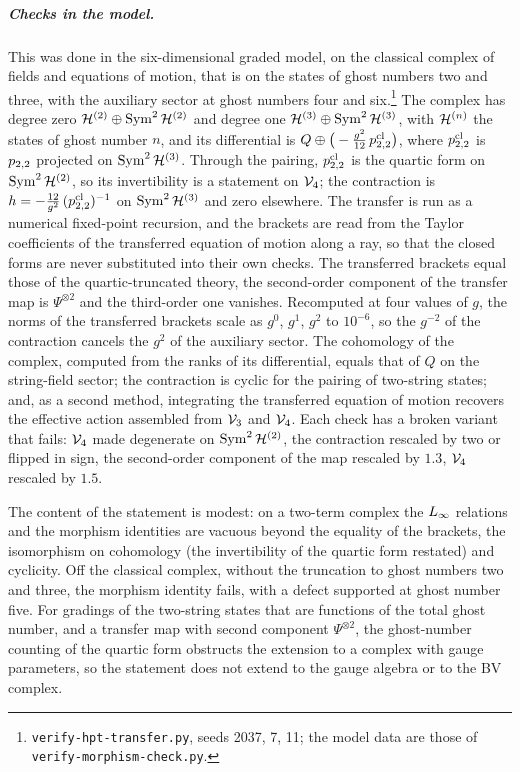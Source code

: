 \subparagraph{Checks in the model.}
This was done in the six-dimensional graded model, on the classical complex of fields and equations of motion, that is on the states of ghost numbers two and three, with the auxiliary sector at ghost numbers four and six.\footnote{\texttt{verify-hpt-transfer.py}, seeds 2037, 7, 11; the model data are those of \texttt{verify-morphism-check.py}.}
The complex has degree zero $\mathcal{H}^{(2)} \oplus \operatorname{Sym}^2 \mathcal{H}^{(2)}$ and degree one $\mathcal{H}^{(3)} \oplus \operatorname{Sym}^2 \mathcal{H}^{(3)}$, with $\mathcal{H}^{(n)}$ the states of ghost number $n$, and its differential is $Q \oplus \big( - \tfrac{g^2}{12} \, p_{2,2}^{\mathrm{cl}} \big)$, where $p_{2,2}^{\mathrm{cl}}$ is $p_{2,2}$ projected on $\operatorname{Sym}^2 \mathcal{H}^{(3)}$.
Through the pairing, $p_{2,2}^{\mathrm{cl}}$ is the quartic form on $\operatorname{Sym}^2 \mathcal{H}^{(2)}$, so its invertibility is a statement on $\mathcal{V}_{4}$; the contraction is $h = - \tfrac{12}{g^2} \, (p_{2,2}^{\mathrm{cl}})^{-1}$ on $\operatorname{Sym}^2 \mathcal{H}^{(3)}$ and zero elsewhere.
The transfer is run as a numerical fixed-point recursion, and the brackets are read from the Taylor coefficients of the transferred equation of motion along a ray, so that the closed forms are never substituted into their own checks.
The transferred brackets equal those of the quartic-truncated theory, the second-order component of the transfer map is $\Psi^{\otimes 2}$ and the third-order one vanishes.
Recomputed at four values of $g$, the norms of the transferred brackets scale as $g^0$, $g^1$, $g^2$ to $10^{-6}$, so the $g^{-2}$ of the contraction cancels the $g^2$ of the auxiliary sector.
The cohomology of the complex, computed from the ranks of its differential, equals that of $Q$ on the string-field sector; the contraction is cyclic for the pairing of two-string states; and, as a second method, integrating the transferred equation of motion recovers the effective action assembled from $\mathcal{V}_{3}$ and $\mathcal{V}_{4}$.
Each check has a broken variant that fails: $\mathcal{V}_{4}$ made degenerate on $\operatorname{Sym}^2 \mathcal{H}^{(2)}$, the contraction rescaled by two or flipped in sign, the second-order component of the map rescaled by $1.3$, $\mathcal{V}_{4}$ rescaled by $1.5$.

The content of the statement is modest: on a two-term complex the $L_\infty$ relations and the morphism identities are vacuous beyond the equality of the brackets, the isomorphism on cohomology (the invertibility of the quartic form restated) and cyclicity.
Off the classical complex, without the truncation to ghost numbers two and three, the morphism identity fails, with a defect supported at ghost number five.
For gradings of the two-string states that are functions of the total ghost number, and a transfer map with second component $\Psi^{\otimes 2}$, the ghost-number counting of the quartic form obstructs the extension to a complex with gauge parameters, so the statement does not extend to the gauge algebra or to the BV complex.

